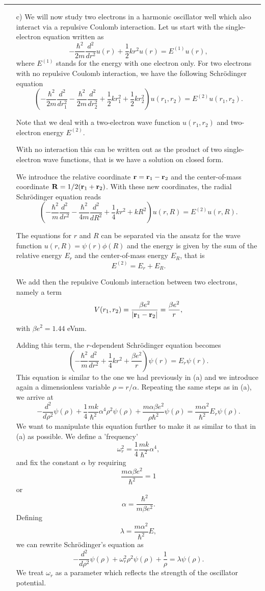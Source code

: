 \documentclass[11pt,a4wide]{article}
\begin{document}
\noindent\rule{\textwidth}{1pt}
\begin{enumerate}
\item[c)] We will now study two electrons in a harmonic oscillator well which
also interact via a repulsive Coulomb interaction.
Let us start with the single-electron equation written as
\[
  -\frac{\hbar^2}{2 m} \frac{d^2}{dr^2} u(r) 
       + \frac{1}{2}k r^2u(r)  = E^{(1)} u(r),
\]
where $E^{(1)}$ stands for the energy with one electron only.
For two electrons with no repulsive Coulomb interaction, we have the following 
Schr\"odinger equation
\[
\left(  -\frac{\hbar^2}{2 m} \frac{d^2}{dr_1^2} -\frac{\hbar^2}{2 m} \frac{d^2}{dr_2^2}+ \frac{1}{2}k r_1^2+ \frac{1}{2}k r_2^2\right)u(r_1,r_2)  = E^{(2)} u(r_1,r_2) .
\]


Note that we deal with a two-electron wave function $u(r_1,r_2)$ and 
two-electron energy $E^{(2)}$.

With no interaction this can be written out as the product of two
single-electron wave functions, that is we have a solution on closed form.

We introduce the relative coordinate ${\bf r} = {\bf r}_1-{\bf r}_2$
and the center-of-mass coordinate ${\bf R} = 1/2({\bf r}_1+{\bf r}_2)$.
With these new coordinates, the radial Schr\"odinger equation reads
\[
\left(  -\frac{\hbar^2}{m} \frac{d^2}{dr^2} -\frac{\hbar^2}{4 m} \frac{d^2}{dR^2}+ \frac{1}{4} k r^2+  kR^2\right)u(r,R)  = E^{(2)} u(r,R).
\]

The equations for $r$ and $R$ can be separated via the ansatz for the 
wave function $u(r,R) = \psi(r)\phi(R)$ and the energy is given by the sum
of the relative energy $E_r$ and the center-of-mass energy $E_R$, that
is
\[
E^{(2)}=E_r+E_R.
\]

We add then the repulsive Coulomb interaction between two electrons,
namely a term 
\[
V(r_1,r_2) = \frac{\beta e^2}{|{\bf r}_1-{\bf r}_2|}=\frac{\beta e^2}{r},
\]
with $\beta e^2=1.44$ eVnm.

Adding this term, the $r$-dependent Schr\"odinger equation becomes
\[
\left(  -\frac{\hbar^2}{m} \frac{d^2}{dr^2}+ \frac{1}{4}k r^2+\frac{\beta e^2}{r}\right)\psi(r)  = E_r \psi(r).
\]
This equation is similar to the one we had previously in (a) and we introduce
again a dimensionless variable $\rho = r/\alpha$. Repeating the same
steps as in (a), we arrive at 
\[
  -\frac{d^2}{d\rho^2} \psi(\rho) 
       + \frac{1}{4}\frac{mk}{\hbar^2} \alpha^4\rho^2\psi(\rho)+\frac{m\alpha \beta e^2}{\rho\hbar^2}\psi(\rho)  = 
\frac{m\alpha^2}{\hbar^2}E_r \psi(\rho) .
\]
We want to manipulate this equation further to make it as similar to that in (a)
as possible. We define a 'frequency' 
\[
\omega_r^2=\frac{1}{4}\frac{mk}{\hbar^2} \alpha^4,
\]
and fix the constant $\alpha$ by requiring 
\[
\frac{m\alpha \beta e^2}{\hbar^2}=1
\]
or 
\[
\alpha = \frac{\hbar^2}{m\beta e^2}.
\]
Defining 
\[
\lambda = \frac{m\alpha^2}{\hbar^2}E,
\]
we can rewrite Schr\"odinger's equation as
\[
  -\frac{d^2}{d\rho^2} \psi(\rho) + \omega_r^2\rho^2\psi(\rho) +\frac{1}{\rho} = \lambda \psi(\rho).
\]
We treat $\omega_r$ as a parameter which reflects the strength of the oscillator potential.


\end{enumerate}
\end{document}
